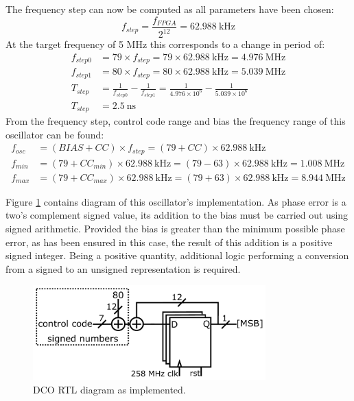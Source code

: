 The frequency step can now be computed as all parameters have been chosen:
\begin{equation}
f_{step} = \frac{f_{FPGA}}{2^{12}} = 62.988~\si{\kilo\hertz}
\end{equation}
At the target frequency of 5 MHz this corresponds to a change in period of:
\begin{align}
f_{step0} &= 79 \times f_{step} = 79 \times 62.988~\si{\kilo\hertz} = 4.976~\si{\mega\hertz} \\
f_{step1} &= 80 \times f_{step} = 80 \times 62.988~\si{\kilo\hertz} = 5.039~\si{\mega\hertz} \\
T_{step}  &= \frac{1}{f_{step0}} - \frac{1}{f_{step1}} = \frac{1}{4.976\times 10^6} - \frac{1}{5.039\times 10^6} \\
T_{step}  &= 2.5~\si{\nano\second}
\end{align}
From the frequency step, control code range and bias the frequency range of this oscillator can be found:
\begin{align}
f_{osc} &= (BIAS+CC)\times f_{step} = (79+CC)\times 62.988~\si{\kilo\hertz}\\
f_{min} &= (79+CC_{min})\times 62.988~\si{\kilo\hertz} = (79-63)\times 62.988~\si{\kilo\hertz} = 1.008~\si{\mega\hertz}\\
f_{max} &= (79+CC_{max})\times 62.988~\si{\kilo\hertz} = (79+63)\times 62.988~\si{\kilo\hertz} = 8.944~\si{\mega\hertz}
\end{align}

Figure \ref{fig:osc2_impl} contains  diagram of this oscillator's implementation. As phase error is a two's complement signed value, its addition to the bias must be carried out using signed arithmetic. Provided the bias is greater than the minimum possible phase error, as has been ensured in this case, the result of this addition is a positive signed integer. Being a positive quantity, additional logic performing a conversion from a signed to an unsigned representation is required.
\begin{figure}[h]%
    \centering
    \includegraphics[width=0.8\textwidth]{../osc2_impl} 
    \caption[\ac{DCO} \ac{RTL} diagram as implemented]{\ac{DCO} \ac{RTL} diagram as implemented.}
    \label{fig:osc2_impl}
\end{figure}

